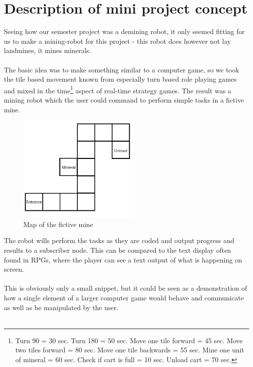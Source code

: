 \chapter{Description of mini project concept}

Seeing how our semester project was a demining robot, it only seemed fitting for us to make a mining-robot for this project - this robot does however not lay landmines, it mines minerals.\\
\\
The basic idea was to make something similar to a computer game, so we took the tile based movement known from especially turn based role playing games and mixed in the time\footnote{Turn 90 \textdegree = 30 sec. Turn 180 \textdegree = 50 sec. Move one tile forward = 45 sec. Move two tiles forward = 80 sec. Move one tile backwards = 55 sec. Mine one unit of mineral = 60 sec. Check if cart is full = 10 sec. Unload cart = 70 sec.} aspect of real-time strategy games. The result was a mining robot which the user could command to perform simple tasks in a fictive mine.

\begin{figure}[!ht]
  \centering
  \includegraphics[width=6cm]{RPro-Mini-Project-B332b/00 - Images/mineMap.png}
  \caption{Map of the fictive mine}
\end{figure}

The robot wills perform the tasks as they are coded and output progress and results to a subscriber node. This can be compared to the text display often found in RPGs, where the player can see a text output of what is happening on screen.\\
\\
This is obviously only a small snippet, but it could be seen as a demonstration of how a single element of a larger computer game would behave and communicate as well as be manipulated by the user.\\
\\
